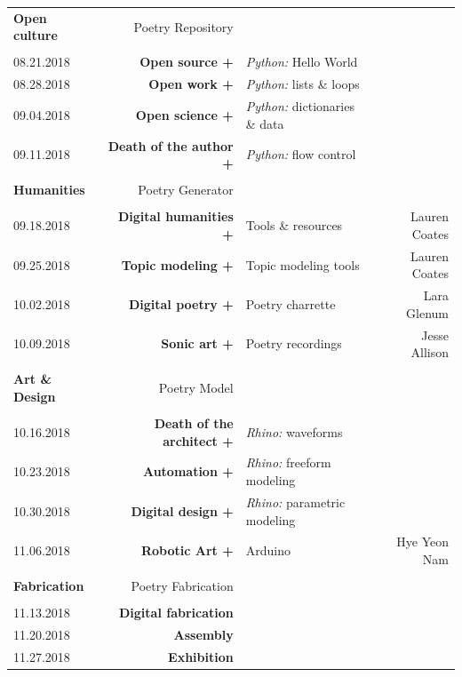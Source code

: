 \documentclass[11pt,article,oneside]{memoir}
\begin{document}
\begin{table}[H]
\begin{tabular}{l r @{\hskip 0.1cm} l r}
\\
\normalsize
\textbf{Open culture} & Poetry Repository\\
\small
\\
08.21.2018 & \textbf{Open source +} & \emph{Python:} Hello World \\
08.28.2018 & \textbf{Open work +} & \emph{Python:} lists \& loops \\
09.04.2018 & \textbf{Open science +} & \emph{Python:} dictionaries \& data \\
09.11.2018 & \textbf{Death of the author +} & \emph{Python:} flow control \\
\\
\normalsize

\textbf{Humanities} & Poetry Generator\\
\small
\\
09.18.2018 & \textbf{Digital humanities +} & Tools \& resources  & Lauren Coates \\
09.25.2018 & \textbf{Topic modeling +} & Topic modeling tools & Lauren Coates \\
10.02.2018 & \textbf{Digital poetry +} & Poetry charrette & Lara Glenum \\ %
10.09.2018 & \textbf{Sonic art +} & Poetry recordings & Jesse Allison \\ 
\\
\normalsize
\textbf{Art \& Design} & Poetry Model \\
\small
\\
10.16.2018 & \textbf{Death of the architect +} & \emph{Rhino:} waveforms \\
10.23.2018 & \textbf{Automation +} & \emph{Rhino:} freeform modeling \\
10.30.2018 & \textbf{Digital design +} & \emph{Rhino:} parametric modeling \\
11.06.2018 & \textbf{Robotic Art +} & Arduino & Hye Yeon Nam \\
\\
\normalsize
\textbf{Fabrication} & Poetry Fabrication\\
\small
\\
11.13.2018 & \textbf{Digital fabrication} \\
11.20.2018 & \textbf{Assembly} \\
11.27.2018 & \textbf{Exhibition} \\ 
%
\end{tabular}
\end{table}
\end{document}
